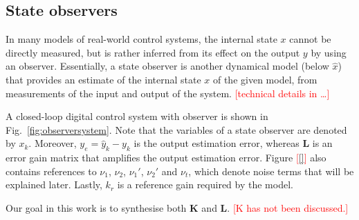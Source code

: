 \documentclass[sigconf]{llncs}
\newcommand{\mat}[1]{\boldsymbol{#1}}
\renewcommand{\vec}[1]{\boldsymbol{#1}}
\renewcommand{\note}[1]{\textcolor{red}{[#1]}}
\begin{document}
\subsection{State observers}\label{sec:observer}

In many models of real-world control systems, 
the internal state $x$ cannot be directly measured,  
but is rather inferred from its effect on the output $y$ by using an observer.  
Essentially, a state observer is another dynamical model (below $\hat x$) 
that provides an estimate of the internal state $x$ of the given model, 
from measurements of the input and output of the system. \note{technical details in \ldots} 

A closed-loop digital control system with observer is shown in Fig.~\ref{fig:observersystem}. 
Note that the variables of a state observer are denoted by $x_k$. 
  Moreover, $y_e=\hat{y}_k - y_k$ is the output estimation error,  
  whereas $\mat{L}$ is an error gain matrix that amplifies the output estimation error. 
Figure \note{\ref{}} also contains references to $\nu_1$, $\nu_2$, $\nu_1'$, $\nu_2'$ and $\nu_t$, which
  denote noise terms that will be explained later.   
  Lastly, $k_r$ is a reference gain required by the model.  
  
     Our goal in this work is to synthesise both $\mat{K}$ and $\mat{L}$. \note{K has not been discussed.}
 
\end{document}
